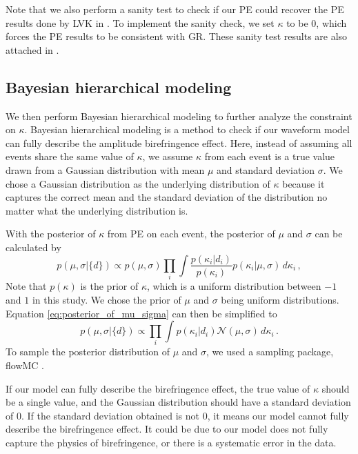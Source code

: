 \documentclass[aps,prd,twocolumn,superscriptaddress,preprintnumbers,floatfix,nofootinbib]{revtex4-2}
\begin{document}
Note that we also perform a sanity test to check if our PE could recover the PE results done by LVK in \citet{GWTC-2.1, GWTC-3}.
To implement the sanity check, we set $\kappa$ to be $0$, which forces the PE results to be consistent with GR.
These sanity test results are also attached in \citet{dataset}.

\subsection{Bayesian hierarchical modeling}
We then perform Bayesian hierarchical modeling to further analyze the constraint on $\kappa$.
Bayesian hierarchical modeling is a method to check if our waveform model can fully describe the amplitude birefringence effect.
Here, instead of assuming all events share the same value of $\kappa$, we assume $\kappa$ from each event is a true value drawn from a Gaussian distribution with mean $\mu$ and standard deviation $\sigma$.
We chose a Gaussian distribution as the underlying distribution of $\kappa$ because it captures the correct mean and the standard deviation of the distribution no matter what the underlying distribution is.

With the posterior of $\kappa$ from PE on each event, the posterior of $\mu$ and $\sigma$ can be calculated by
\begin{equation}
    p(\mu,\sigma|\{d\})\propto p(\mu,\sigma)\prod_{i}\int\frac{p(\kappa_i|d_i)}{p(\kappa_i)}p(\kappa_i|\mu,\sigma)\,d\kappa_i\,,
    \label{eq:posterior_of_mu_sigma}
\end{equation}
Note that $p(\kappa)$ is the prior of $\kappa$, which is a uniform distribution between $-1$ and $1$ in this study.
We chose the prior of $\mu$ and $\sigma$ being uniform distributions.
Equation \ref{eq:posterior_of_mu_sigma} can then be simplified to
\begin{equation}
    p(\mu,\sigma|\{d\})\propto\prod_{i}\int p(\kappa_i|d_i)\mathcal{N}(\mu,\sigma)\,d\kappa_i\,.
\end{equation}
To sample the posterior distribution of $\mu$ and $\sigma$, we used a sampling package, flowMC \citep{flowMC}.

If our model can fully describe the birefringence effect, the true value of $\kappa$ should be a single value, and the Gaussian distribution should have a standard deviation of $0$.
If the standard deviation obtained is not $0$, it means our model cannot fully describe the birefringence effect.
It could be due to our model does not fully capture the physics of birefringence, or there is a systematic error in the data.
\end{document}
